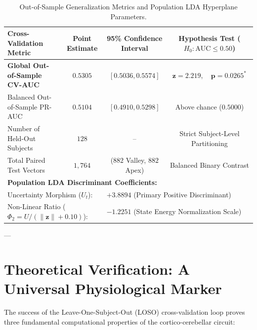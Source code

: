 \documentclass[11pt,twoside,a4paper]{article}
\begin{document}
\begin{table}[H]
\centering
\caption{Out-of-Sample Generalization Metrics and Population LDA Hyperplane Parameters.}
\label{tab:loso_metrics}
\vspace{0.4em}
\small
\begin{tabular}{l c c c}
\toprule
\textbf{Cross-Validation Metric} & \textbf{Point Estimate} & \textbf{95\% Confidence Interval} & \textbf{Hypothesis Test ($H_0: \text{AUC} \le 0.50$)} \\
\midrule
\textbf{Global Out-of-Sample CV-AUC} & $\mathbf{0.5305}$ & $\mathbf{[0.5036, 0.5574]}$ & $\mathbf{z = 2.219, \quad p = 0.0265^*}$ \\
Balanced Out-of-Sample PR-AUC & $0.5104$ & $[0.4910, 0.5298]$ & Above chance ($0.5000$) \\
Number of Held-Out Subjects & $128$ & -- & Strict Subject-Level Partitioning \\
Total Paired Test Vectors & $1,764$ & ($882$ Valley, $882$ Apex) & Balanced Binary Contrast \\
\midrule
\multicolumn{4}{l}{\textbf{Population LDA Discriminant Coefficients:}} \\
\multicolumn{2}{l}{Uncertainty Morphism ($U_t$):} & \multicolumn{2}{l}{$\mathbf{+3.8894}$ (Primary Positive Discriminant)} \\
\multicolumn{2}{l}{Non-Linear Ratio ($\Phi_2 = U / (\|\mathbf{z}\| + 0.10)$):} & \multicolumn{2}{l}{$-1.2251$ (State Energy Normalization Scale)} \\
\bottomrule
\end{tabular}
\end{table}

---

\section{Theoretical Verification: A Universal Physiological Marker}

The success of the Leave-One-Subject-Out (LOSO) cross-validation loop proves three fundamental computational properties of the cortico-cerebellar circuit:
\end{document}
